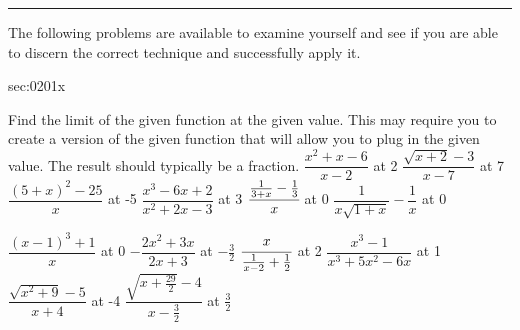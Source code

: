 \renewcommand{\columnseprule}{1.5pt}
\begin{multicols*}{2}
\rule[0.5\baselineskip]{0.4\textwidth}{1pt}
\noindent%
\ExSection\label{sec:0201x}
The following problems are available to examine yourself
and see if you are able to discern the correct technique and successfully apply it.
\begin{exercises}{sec:0201x}

\prob[0201Remove1] Find the limit of the given function at the given value.
This may require you to create a version of the given function that will 
allow you to plug in the given value.  The result should typically be a fraction.
\subprob $\dfrac{x^2+x-6}{x-2}$ at 2
\subprob $\dfrac{\sqrt{x+2}-3}{x-7}$ at 7
\subprob $\dfrac{(5+x)^2-25}{x}$ at -5
\subprob $\dfrac{x^3-6x+2}{x^2+2x-3}$ at 3
\subprob $\cfrac{\frac{1}{3+x} - \frac{1}{3}}{x}$ at 0
\subprob $\dfrac{1}{x\sqrt{1+x}}-\dfrac{1}{x}$ at 0


\prob[0201Remove2] 
\subprob $\dfrac{(x-1)^3+1}{x}$ at 0
\subprob $-\dfrac{2x^2+3x}{2x+3}$ at $-\frac{3}{2}$
\subprob $\cfrac{x}{\frac{1}{x-2}+\frac{1}{2}}$ at 2
\subprob $\dfrac{x^3-1}{x^3+5x^2-6x}$ at 1
\subprob $\dfrac{\sqrt{x^2+9}-5}{x+4}$ at -4
\subprob $\dfrac{\sqrt{x+\frac{29}{2}}-4}{x-\frac{3}{2}}$ at $\frac{3}{2}$

\end{exercises}
\end{multicols*}

